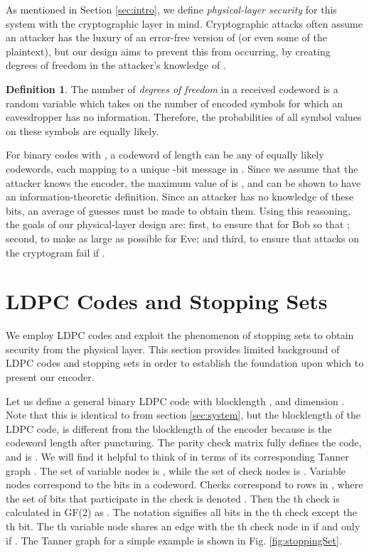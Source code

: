 \documentclass[10pt,twocolumn,twoside]{IEEEtran} \newlength{\pic}
\theoremstyle{definition}
\newtheorem{definition}{Definition}
\theoremstyle{remark}
\theoremstyle{plain}
\begin{document}
As mentioned in Section \ref{sec:intro}, we define \emph{physical-layer security} for this system with the cryptographic layer in mind. Cryptographic attacks often assume an attacker has the luxury of an error-free version of  (or even some of the plaintext), but our design aims to prevent this from occurring, by creating degrees of freedom in the attacker's knowledge of .
\begin{definition}\label{def:degsFreedom}
 The number of \emph{degrees of freedom} in a received codeword is a random variable  which takes on the number of encoded symbols for which an eavesdropper has no information. Therefore, the probabilities of all symbol values on these  symbols are equally likely.
\end{definition}
For binary codes with , a codeword of length  can be any of  equally likely codewords, each mapping to a unique -bit message in . Since we assume that the attacker knows the encoder, the maximum value of  is , and can be shown to have an information-theoretic definition. Since an attacker has no knowledge of these bits, an average of  guesses must be made to obtain them. Using this reasoning, the goals of our physical-layer design are: first, to ensure that  for Bob so that ; second, to make  as large as possible for Eve; and third, to ensure that attacks on the cryptogram fail if .

\section{LDPC Codes and Stopping Sets}\label{sec:stoppingSets}
We employ LDPC codes \cite{Gallager63} and exploit the phenomenon of stopping sets to obtain security from the physical layer. This section provides limited background of LDPC codes and stopping sets in order to establish the foundation upon which to present our encoder.

Let us define a general binary LDPC code  with blocklength , and dimension . Note that this  is identical to  from section \ref{sec:system}, but  the blocklength of the LDPC code, is different from  the blocklength of the encoder because  is the codeword length after puncturing. The parity check matrix  fully defines the code, and is . We will find it helpful to think of  in terms of its corresponding Tanner graph  \cite{MoonArches,UrbankeModern}. The set of variable nodes is , while the set of check nodes is . Variable nodes correspond to the  bits in a codeword. Checks correspond to rows in , where the set of bits that participate in the check  is denoted  \cite{MoonArches}. Then the th check is calculated in GF(2) as . The notation  signifies all bits in the th check except the th bit. The th variable node shares an edge with the th check node in  if and only if . The Tanner graph for a simple example is shown in Fig. \ref{fig:stoppingSet}.
\end{document}
